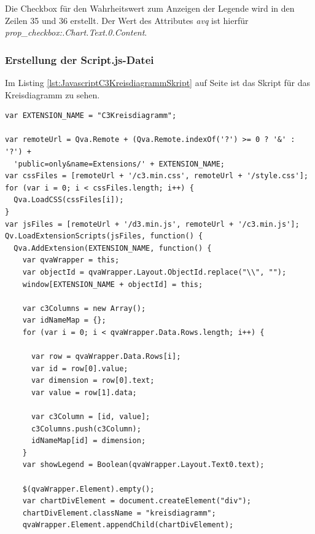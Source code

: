 Die Checkbox für den Wahrheits\-wert zum Anzeigen der Legende wird in den Zeilen 35 und 36 erstellt. Der Wert des Attributes \textit{avq} ist hierfür \textit{prop\_checkbox:.Chart.Text.0.Content}.

\subsubsection{Erstellung der Script.js-Datei}
\label{lab:ErstellungDerScriptJsDateiQvEoJs} 

Im Listing \ref{lst:JavascriptC3KreisdiagrammSkript} auf Seite \pageref{lst:JavascriptC3KreisdiagrammSkript} ist das Skript für das Kreisdiagramm zu sehen.


\begin{listing}[htbp]
\begin{verbatim}
var EXTENSION_NAME = "C3Kreisdiagramm";

var remoteUrl = Qva.Remote + (Qva.Remote.indexOf('?') >= 0 ? '&' : '?') +
  'public=only&name=Extensions/' + EXTENSION_NAME;
var cssFiles = [remoteUrl + '/c3.min.css', remoteUrl + '/style.css'];
for (var i = 0; i < cssFiles.length; i++) {
  Qva.LoadCSS(cssFiles[i]);
}
var jsFiles = [remoteUrl + '/d3.min.js', remoteUrl + '/c3.min.js'];
Qv.LoadExtensionScripts(jsFiles, function() {
  Qva.AddExtension(EXTENSION_NAME, function() {
    var qvaWrapper = this;
    var objectId = qvaWrapper.Layout.ObjectId.replace("\\", "");
    window[EXTENSION_NAME + objectId] = this;

    var c3Columns = new Array();
    var idNameMap = {};
    for (var i = 0; i < qvaWrapper.Data.Rows.length; i++) {

      var row = qvaWrapper.Data.Rows[i];
      var id = row[0].value;
      var dimension = row[0].text;
      var value = row[1].data;

      var c3Column = [id, value];
      c3Columns.push(c3Column);
      idNameMap[id] = dimension;
    }
    var showLegend = Boolean(qvaWrapper.Layout.Text0.text);

    $(qvaWrapper.Element).empty();
    var chartDivElement = document.createElement("div");
    chartDivElement.className = "kreisdiagramm";
    qvaWrapper.Element.appendChild(chartDivElement);


\end{verbatim}
\end{listing}
